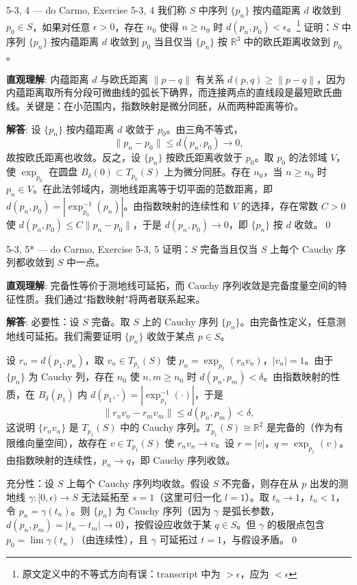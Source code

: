 \begin{exercise}{5-3, 4 — do Carmo, Exercise 5-3, 4}
我们称 $S$ 中序列 $\{p_n\}$ 按内蕴距离 $d$ 收敛到 $p_0 \in S$，如果对任意 $\epsilon > 0$，存在 $n_0$ 使得 $n \geq n_0$ 时 $d(p_n, p_0) < \epsilon$。\footnote{原文定义中的不等式方向有误：transcript 中为 $> \epsilon$，应为 $< \epsilon$} 证明：$S$ 中序列 $\{p_n\}$ 按内蕴距离 $d$ 收敛到 $p_0$ 当且仅当 $\{p_n\}$ 按 $\mathbb{R}^3$ 中的欧氏距离收敛到 $p_0$。
\end{exercise}
\begin{solution}
\textbf{直观理解}: 内蕴距离 $d$ 与欧氏距离 $\|p-q\|$ 有关系 $d(p,q) \geq \|p-q\|$，因为内蕴距离取所有分段可微曲线的弧长下确界，而连接两点的直线段是最短欧氏曲线。关键是：在小范围内，指数映射是微分同胚，从而两种距离等价。

\textbf{解答}: 设 $\{p_n\}$ 按内蕴距离 $d$ 收敛于 $p_0$。由三角不等式，
\[
\|p_n-p_0\| \leq d(p_n,p_0) \to 0,
\]
故按欧氏距离也收敛。反之，设 $\{p_n\}$ 按欧氏距离收敛于 $p_0$。取 $p_0$ 的法邻域 $V$，使 $\exp_{p_0}$ 在圆盘 $B_\delta(0)\subset T_{p_0}(S)$ 上为微分同胚。存在 $n_0$，当 $n\geq n_0$ 时 $p_n \in V$。在此法邻域内，测地线距离等于切平面的范数距离，即 $d(p_n,p_0) = |\exp_{p_0}^{-1}(p_n)|$。由指数映射的连续性和 $V$ 的选择，存在常数 $C>0$ 使 $d(p_n,p_0) \leq C\|p_n-p_0\|$，于是 $d(p_n,p_0)\to 0$，即 $\{p_n\}$ 按 $d$ 收敛。\qed
\end{solution}

\begin{exercise}{5-3, 5* — do Carmo, Exercise 5-3, 5}
证明：$S$ 完备当且仅当 $S$ 上每个 Cauchy 序列都收敛到 $S$ 中一点。
\end{exercise}
\begin{solution}
\textbf{直观理解}: 完备性等价于测地线可延拓，而 Cauchy 序列收敛是完备度量空间的特征性质。我们通过"指数映射"将两者联系起来。

\textbf{解答}: 必要性：设 $S$ 完备。取 $S$ 上的 Cauchy 序列 $\{p_n\}$。由完备性定义，任意测地线可延拓。我们需要证明 $\{p_n\}$ 收敛于某点 $p \in S$。

设 $r_n = d(p_1,p_n)$，取 $v_n \in T_{p_1}(S)$ 使 $p_n = \exp_{p_1}(r_n v_n)$，$|v_n|=1$。由于 $\{p_n\}$ 为 Cauchy 列，存在 $n_0$ 使 $n,m \geq n_0$ 时 $d(p_n,p_m) < \delta$。由指数映射的性质，在 $B_\delta(p_1)$ 内 $d(p_1,\cdot) = |\exp_{p_1}^{-1}(\cdot)|$，于是
\[
\|r_n v_n - r_m v_m\| \leq d(p_n,p_m) < \delta,
\]
这说明 $\{r_n v_n\}$ 是 $T_{p_1}(S)$ 中的 Cauchy 序列。$T_{p_1}(S) \cong \mathbb{R}^2$ 是完备的（作为有限维向量空间），故存在 $v \in T_{p_1}(S)$ 使 $r_n v_n \to v$。设 $r = |v|$，$q = \exp_{p_1}(v)$。由指数映射的连续性，$p_n \to q$，即 Cauchy 序列收敛。

充分性：设 $S$ 上每个 Cauchy 序列均收敛。假设 $S$ 不完备，则存在从 $p$ 出发的测地线 $\gamma: [0,\epsilon)\to S$ 无法延拓至 $s=1$（这里可归一化 $l=1$）。取 $t_n \to 1$，$t_n < 1$，令 $p_n = \gamma(t_n)$。则 $\{p_n\}$ 为 Cauchy 序列（因为 $\gamma$ 是弧长参数，$d(p_n,p_m) = |t_n-t_m|\to 0$），按假设应收敛于某 $q \in S$。但 $\gamma$ 的极限点包含 $p_0 = \lim\gamma(t_n)$（由连续性），且 $\gamma$ 可延拓过 $t=1$，与假设矛盾。\qed
\end{solution}

